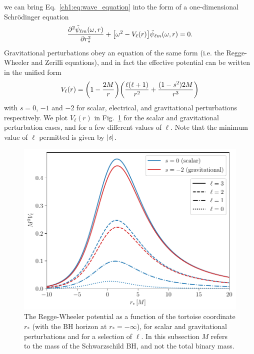 we can bring Eq.~\ref{ch1:eq:wave_equation} into the form of a one-dimensional Schr\"{o}dinger equation
\begin{equation}\label{ch1:eq:fd_wave_equation}
    \pdv[2]{\tilde{\psi}_{\ell m}(\omega,r)}{r_*} + \qty[ \omega^2 - V_\ell(r)] \tilde{\psi}_{\ell m}(\omega,r) = 0.
\end{equation}
Gravitational perturbations obey an equation of the same form (i.e. the Regge-Wheeler and Zerilli equations), and in fact the effective potential can be written in the unified form
\begin{equation}\label{ch1:eq:rw_potential}
    V_\ell(r) = \qty( 1 - \frac{2M}{r} ) \qty( \frac{\ell (\ell + 1)}{r^2} + \frac{(1 - s^2)2M}{r^3} )
\end{equation}
with $s = 0$, $-1$ and $-2$ for scalar, electrical, and gravitational perturbations respectively. 
We plot $V_\ell(r)$ in Fig.~\ref{ch1:fig:rw_potential} for the scalar and gravitational perturbation cases, and for a few different values of $\ell$. 
Note that the minimum value of $\ell$ permitted is given by $\abs{s}$.

\begin{figure}[t]
    \centering
    \includegraphics[width=0.6\columnwidth]{Figures/Introduction/rw_potential.pdf}
    \caption[Regge-Wheeler potential]{
    The Regge-Wheeler potential as a function of the tortoise coordinate $r_*$ (with the BH horizon at $r_* = -\infty$), for scalar and gravitational perturbations and for a selection of $\ell$. In this subsection $M$ refers to the mass of the Schwarzschild BH, and not the total binary mass.
    }
    \label{ch1:fig:rw_potential}
\end{figure}

